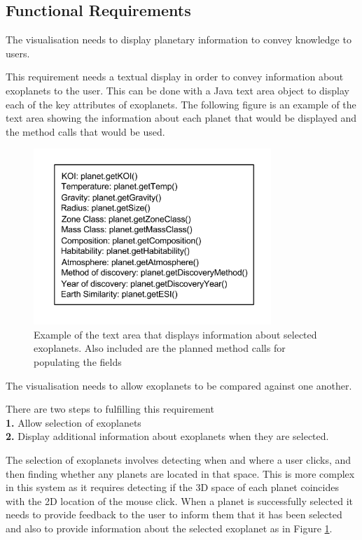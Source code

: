 \subsection{Functional Requirements}
\begin{enumerate}

{\bf
 \item[R1.] The visualisation needs to display planetary information to convey
knowledge to users.
}

  This requirement needs a textual display in order to convey information about
exoplanets to the user. This can be done with a Java
text area object to display each of the key
attributes of exoplanets. The following figure is an example of the text area
showing the information about each planet that would be displayed and the method
calls that would be used.

\begin{figure}[H]
  \centering
      \includegraphics[width=0.8\textwidth]{images/textAreaMockup.png}
  \caption[Example of the text area]{Example of the text area that displays
information about selected exoplanets. Also included are the planned method
calls for populating the fields}
  \label{fig:text}
\end{figure}


\clearpage
{\bf
 \item[R2.] The visualisation needs to allow exoplanets to be compared against
one another.}

There are two steps to fulfilling this requirement\\ {\bf1.} Allow selection of
exoplanets \\ {\bf2.} Display additional information about exoplanets when they
are
selected.

The selection of exoplanets involves detecting when and where a user clicks, and
then 
finding whether any planets are
located in that space. This is more complex in this system as it requires
detecting if the 3D space of each planet coincides with the 2D
location of the mouse click. When a planet is successfully selected it needs to
provide feedback to the user to inform them that it has been selected and also
to
provide information about the selected exoplanet as in Figure \ref{fig:text}.


\end{enumerate}
